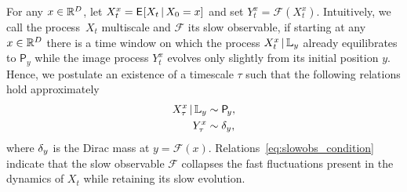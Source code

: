 \documentclass{article}
\newcommand{\obs}{\mathcal{F}} %
\newcommand{\levs}{\mathbb{L}} %
\newcommand{\invm}{\mathsf{P}} %
\begin{document}
For any $x\in\R^D$, let $X^x_t = \Exp[][X_t\cbar X_0=x]$ and set $Y^x_t=\obs(X^x_t)$.
Intuitively, we call the process~$X_t$ multiscale and $\obs$ its slow observable, if starting at any $x\in\R^D$ there is a time window on which the process $X^x_t\cbar\levs_y$ already equilibrates to $\invm_{\!y}$ while the image process $Y^x_t$ evolves only slightly from its initial position $y$. Hence, we postulate an existence of a timescale $\tau$ such that the following relations hold approximately
\begin{gather}\label{eq:slowobs_condition}
\begin{aligned}
    X^x_\tau\cbar \levs_y &\sim \invm_{\!y},\\
    Y^x_\tau &\sim \de_y,
\end{aligned}
\end{gather}
where $\de_y$ is the Dirac mass at $y=\obs(x)$. Relations~\eqref{eq:slowobs_condition} indicate that the slow observable $\obs$ collapses the fast fluctuations present in the dynamics of $X_t$ while retaining its slow evolution.
\end{document}
